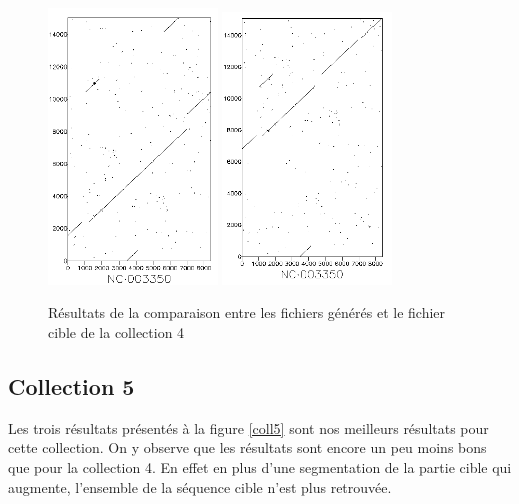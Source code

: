 \documentclass[12pt,a4paper,final]{article}
\begin{document}
\begin{figure}[!ht]
	\centering
	\includegraphics[width=0.4\textwidth]{images/collection4/collection4_2.png}
	\includegraphics[width=0.4\textwidth]{images/collection4/collection4_3.png}
	\caption{\label{coll4}Résultats de la comparaison entre les fichiers générés et le fichier cible de la collection 4}
\end{figure}

\subsection{Collection 5}
Les trois résultats présentés à la figure \ref{coll5} sont nos meilleurs résultats pour cette collection. On y observe que les résultats sont encore un peu moins bons que pour la collection 4. En effet en plus d'une segmentation de la partie cible qui augmente, l'ensemble de la séquence cible n'est plus retrouvée.
\end{document}
